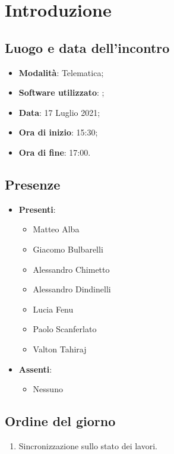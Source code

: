 \documentclass[]{article}
\begin{document}
	

	\newpage


		\section{Introduzione}
		\subsection{Luogo e data dell'incontro}
		\begin{itemize}
			\item \textbf{Modalità}: Telematica;
			\item \textbf{Software utilizzato}: ;
			\item \textbf{Data}: 17 Luglio 2021;
			\item \textbf{Ora di inizio}: 15:30;
			\item \textbf{Ora di fine}: 17:00.
		\end{itemize}

		\subsection{Presenze}
		\begin{itemize}
			\item \textbf{Presenti}:
			\begin{itemize}
				\item Matteo Alba
				\item Giacomo Bulbarelli
				\item Alessandro Chimetto
				\item Alessandro Dindinelli
				\item Lucia Fenu
				\item Paolo Scanferlato
				\item Valton Tahiraj
			\end{itemize}
			\item \textbf{Assenti}:
			\begin{itemize}
				\item Nessuno
			\end{itemize}
		\end{itemize}


		\subsection{Ordine del giorno}
		\begin{enumerate}
			\item Sincronizzazione sullo stato dei lavori.
		\end{enumerate}
\end{document}

